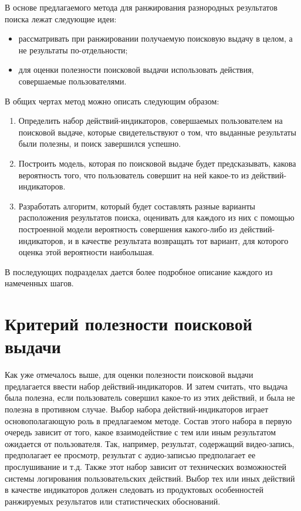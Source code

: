 \documentclass[12pt,a4paper]{report}
\begin{document}
В основе предлагаемого метода для ранжирования разнородных результатов поиска лежат следующие идеи:
\begin{itemize}
\item рассматривать при ранжировании получаемую поисковую выдачу в целом, а не результаты по-отдельности;
\item для оценки полезности поисковой выдачи использовать действия, совершаемые пользователями.
\end{itemize}
В общих чертах метод можно описать следующим образом:
\begin{enumerate}
\item Определить набор действий-индикаторов, совершаемых пользователем на поисковой выдаче, которые свидетельствуют о том, что выданные результаты были полезны, и поиск завершился успешно.
\item Построить модель, которая по поисковой выдаче будет предсказывать, какова вероятность того, что пользователь совершит на ней какое-то из действий-индикаторов.
\item Разработать алгоритм, который будет составлять разные варианты расположения результатов поиска, оценивать для каждого из них с помощью построенной модели вероятность совершения какого-либо из действий-индикаторов, и в качестве результата возвращать тот вариант, для которого оценка этой вероятности наибольшая.
\end{enumerate}
В последующих подразделах дается более подробное описание каждого из намеченных шагов. 

\section{Критерий полезности поисковой выдачи}
\label{sec:utility-criteria}

Как уже отмечалось выше, для оценки полезности поисковой выдачи предлагается ввести набор действий-индикаторов. И затем считать, что выдача была полезна, если пользователь совершил какое-то из этих действий, и была не полезна в противном случае. Выбор набора действий-индикаторов играет основополагающую роль в предлагаемом методе. Состав этого набора в первую очередь зависит от того, какое взаимодействие с тем или иным результатом ожидается от пользователя. Так, например, результат, содержащий видео-запись, предполагает ее просмотр, результат с аудио-записью предполагает ее прослушивание и т.д. Также этот набор зависит от технических возможностей системы логирования пользовательских действий. Выбор тех или иных действий в качестве индикаторов должен следовать из продуктовых особенностей ранжируемых результатов или статистических обоснований.
\end{document}
